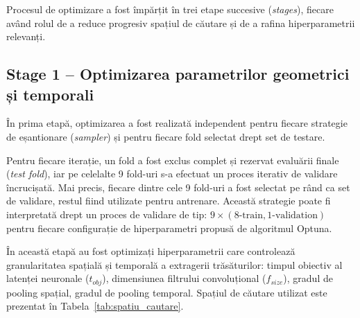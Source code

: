 Procesul de optimizare a fost împărțit în trei etape succesive (\textit{stages}), fiecare având rolul de a reduce progresiv spațiul de căutare și de a rafina hiperparametrii relevanți.

\subsection*{Stage 1 -- Optimizarea parametrilor geometrici și temporali}

În prima etapă, optimizarea a fost realizată independent pentru fiecare strategie de eșantionare (\textit{sampler}) și pentru fiecare fold selectat drept set de testare.

Pentru fiecare iterație, un fold a fost exclus complet și rezervat evaluării finale (\textit{test fold}), iar pe celelalte 9 fold-uri s-a efectuat un proces iterativ de validare încrucișată. Mai precis, fiecare dintre cele 9 fold-uri a fost selectat pe rând ca set de validare, restul fiind utilizate pentru antrenare. Această strategie poate fi interpretată drept un proces de validare de tip: $9 \times (8\text{-train},1\text{-validation})$ pentru fiecare configurație de hiperparametri propusă de algoritmul Optuna.

În această etapă au fost optimizați hiperparametrii care controlează granularitatea spațială și temporală a extragerii trăsăturilor: timpul obiectiv al latenței neuronale ($t_{obj}$), dimensiunea filtrului convoluțional ($f_{size}$), gradul de pooling spațial, gradul de pooling temporal. Spațiul de căutare utilizat este prezentat în Tabela~\ref{tab:spatiu_cautare}.

\begin{table}[htbp]
	\centering
	\caption{Definirea spațiului de căutare pentru optimizarea hiperparametrilor în Stage 1}
	\label{tab:spatiu_cautare}
\end{table}

